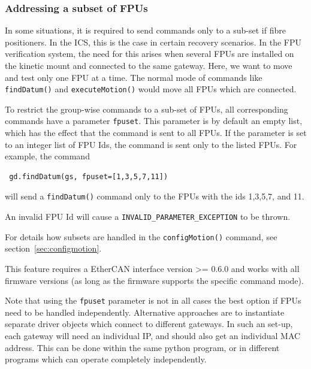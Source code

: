 \documentclass[11pt,a4paper]{report}
\begin{document}
\subsubsection{Addressing a subset of FPUs}
\label{sec:subsets}
 In some situations, it is required
to send commands only to a sub-set if fibre positioners. In the ICS,
this is the case in certain recovery scenarios.  In the FPU
verification system, the need for this arises when several FPUs are
installed on the kinetic mount and connected to the same
gateway. Here, we want to move and test only one FPU at a time. The
normal mode of commands like \texttt{findDatum()} and
\texttt{executeMotion()} would move all FPUs which are connected.

To restrict the group-wise commands to a sub-set of FPUs, all
corresponding commands have a parameter \texttt{fpuset}.  This
parameter is by default an empty list, which has the effect that the
command is sent to all FPUs. If the parameter is set to an integer
list of FPU Ids, the command is sent only to the listed FPUs.
For example, the command

\begin{verbatim}
 gd.findDatum(gs, fpuset=[1,3,5,7,11])
\end{verbatim}
will send a \texttt{findDatum()} command only to the FPUs with the ids
1,3,5,7, and 11.

An invalid FPU Id will cause a \texttt{INVALID\_PARAMETER\_EXCEPTION}
to be thrown.

For details how subsets are handled in the \texttt{configMotion()}
command, see section~\ref{sec:configmotion}.

This feature requires a EtherCAN interface version >= 0.6.0 and works with all
firmware versions (as long as the firmware supports the specific
command mode).

Note that using the \texttt{fpuset} parameter is not in all cases the
best option if FPUs need to be handled independently. Alternative
approaches are to instantiate separate driver objects which connect to
different gateways. In such an set-up, each gateway will need an
individual IP, and should also get an individual MAC address. This can
be done within the same python program, or in different programs which
can operate completely independently.
\end{document}
